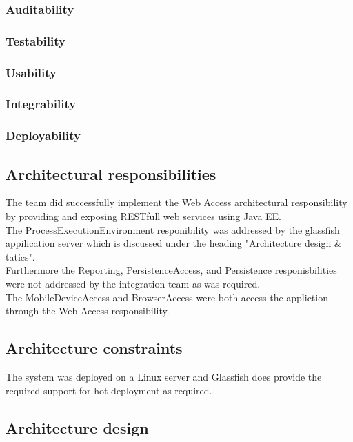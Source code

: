 \documentclass[a4paper,10pt]{article}
\begin{document}
\subsubsection{Auditability}

\subsubsection{Testability}

\subsubsection{Usability}

\subsubsection{Integrability}

\subsubsection{Deployability}

\subsection{Architectural responsibilities}
The team did successfully implement the Web Access architectural responsibility by providing and exposing RESTfull web services using Java EE. \\
The ProcessExecutionEnvironment responibility was addressed by the glassfish appilication server which is discussed under the heading "Architecture design \& tatics". \\
Furthermore the Reporting, PersistenceAccess, and Persistence responisbilities were not addressed by the integration team as was required. \\
The MobileDeviceAccess and BrowserAccess were both access the appliction through the Web Access responsibility.

\subsection{Architecture constraints}
The system was deployed on a Linux server and Glassfish does provide the required support for hot deployment as required.

\subsection{Architecture design}
\end{document}

